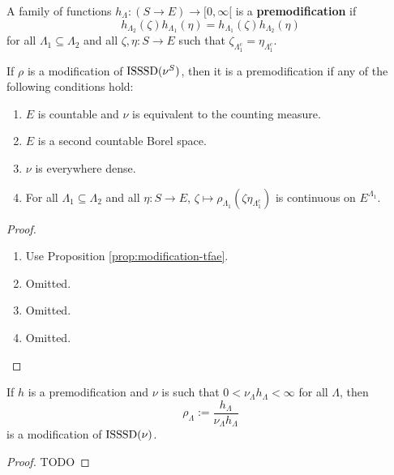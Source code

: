 
\begin{definition}[Premodification]
    \label{def:premodification}

    A family of functions $h_\Lambda : (S \to E) \to [0, \infty[$ is a {\bf premodification} if
    $$h_{\Lambda_2}(\zeta)h_{\Lambda_1}(\eta) = h_{\Lambda_1}(\zeta)h_{\Lambda_2}(\eta)$$
    for all $\Lambda_1 \subseteq \Lambda_2$ and all $\zeta, \eta : S \to E$ such that $\zeta_{\Lambda_1^c} = \eta_{\Lambda_1^c}$.
\end{definition}

\begin{lemma}
    \label{lem:modification-premodification}
    If $\rho$ is a modification of $\operatorname{ISSSD}(\nu^S)$, then it is a premodification if any of the following conditions hold:
    \begin{enumerate}
        \item $E$ is countable and $\nu$ is equivalent to the counting measure.
        \item $E$ is a second countable Borel space.
        \item $\nu$ is everywhere dense.
        \item For all $\Lambda_1 \subseteq \Lambda_2$ and all $\eta : S \to E$, $\zeta \mapsto \rho_{\Lambda_1}(\zeta \eta_{\Lambda_1^c})$ is continuous on $E^{\Lambda_1}$.
    \end{enumerate}
\end{lemma}
\begin{proof}

    \begin{enumerate}
        \item Use Proposition \ref{prop:modification-tfae}.
        \item Omitted.
        \item Omitted.
        \item Omitted.
    \end{enumerate}
\end{proof}

\begin{lemma}
    \label{lem:premodification-modification}

    If $h$ is a premodification and $\nu$ is such that $0 < \nu_\Lambda h_\Lambda < \infty$ for all $\Lambda$, then
    $$\rho_\Lambda := \frac{h_\Lambda}{\nu_\Lambda h_\Lambda}$$
    is a modification of $\operatorname{ISSSD}(\nu)$.
\end{lemma}
\begin{proof}

    TODO
\end{proof}

